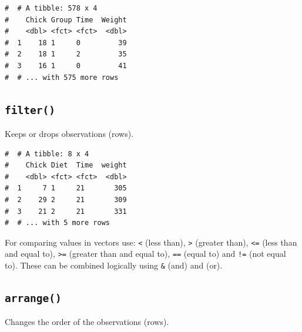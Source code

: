 \documentclass[a4paper,9pt,twocolumn,twoside,printwatermark=false]{pinp}
\begin{document}
\begin{ShadedResult}
\begin{verbatim}
#  # A tibble: 578 x 4
#    Chick Group Time  Weight
#    <dbl> <fct> <fct>  <dbl>
#  1    18 1     0         39
#  2    18 1     2         35
#  3    16 1     0         41
#  # ... with 575 more rows
\end{verbatim}
\end{ShadedResult}

\subsection{\texorpdfstring{\texttt{filter()}}{filter()}}\label{filter}

Keeps or drops observations (rows).

\begin{Shaded}
\begin{Highlighting}[]
\OperatorTok{==} \OperatorTok{&}\StringTok{ }\OperatorTok{>}\NormalTok{)}
\end{Highlighting}
\end{Shaded}

\begin{ShadedResult}
\begin{verbatim}
#  # A tibble: 8 x 4
#    Chick Diet  Time  weight
#    <dbl> <fct> <fct>  <dbl>
#  1     7 1     21       305
#  2    29 2     21       309
#  3    21 2     21       331
#  # ... with 5 more rows
\end{verbatim}
\end{ShadedResult}

For comparing values in vectors use: \texttt{\textless{}} (less than),
\texttt{\textgreater{}} (greater than), \texttt{\textless{}=} (less than
and equal to), \texttt{\textgreater{}=} (greater than and equal to),
\texttt{==} (equal to) and \texttt{!=} (not equal to). These can be
combined logically using \texttt{\&} (and) and \texttt{\textbar{}} (or).

\subsection{\texorpdfstring{\texttt{arrange()}}{arrange()}}\label{arrange}

Changes the order of the observations (rows).

\begin{Shaded}
\begin{Highlighting}[]
\end{Highlighting}
\end{Shaded}
\end{document}
